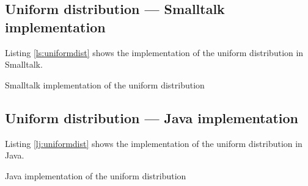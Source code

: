 \documentclass[twoside]{book}
\begin{document}
\subsection{Uniform distribution --- Smalltalk  implementation}
Listing \ref{ls:uniformdist} shows the implementation of the
uniform distribution in Smalltalk.

\begin{listing} Smalltalk implementation of the uniform distribution \label{ls:uniformdist}

\end{listing}

\subsection{Uniform distribution --- Java  implementation}
Listing \ref{lj:uniformdist} shows the implementation of the
uniform distribution in Java.

\begin{listing} Java implementation of the uniform distribution \label{lj:uniformdist}

\end{listing}
\end{document}
